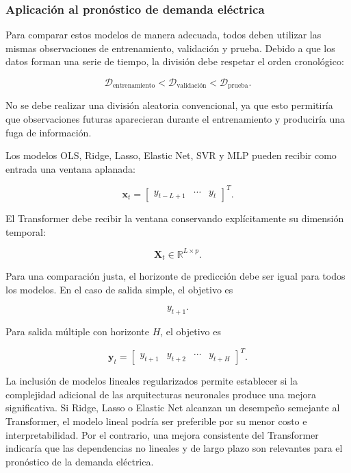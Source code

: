 \subsubsection{Aplicación al pronóstico de demanda eléctrica}
\label{sec:aplicacion_demanda}

Para comparar estos modelos de manera adecuada, todos deben utilizar las mismas observaciones de entrenamiento, validación y prueba. Debido a que los datos forman una serie de tiempo, la división debe respetar el orden cronológico:

\begin{equation}
    \mathcal{D}_{\mathrm{entrenamiento}}
    <
    \mathcal{D}_{\mathrm{validación}}
    <
    \mathcal{D}_{\mathrm{prueba}}.
\end{equation}

No se debe realizar una división aleatoria convencional, ya que esto permitiría que observaciones futuras aparecieran durante el entrenamiento y produciría una fuga de información.

Los modelos OLS, Ridge, Lasso, Elastic Net, SVR y MLP pueden recibir como entrada una ventana aplanada:

\begin{equation}
    \mathbf{x}_t
    =
    \begin{bmatrix}
        y_{t-L+1} &
        \cdots &
        y_t
    \end{bmatrix}^{T}.
\end{equation}

El Transformer debe recibir la ventana conservando explícitamente su dimensión temporal:

\begin{equation}
    \mathbf{X}_t
    \in
    \mathbb{R}^{L\times p}.
\end{equation}

Para una comparación justa, el horizonte de predicción debe ser igual para todos los modelos. En el caso de salida simple, el objetivo es

\begin{equation}
    y_{t+1}.
\end{equation}

Para salida múltiple con horizonte $H$, el objetivo es

\begin{equation}
    \mathbf{y}_t
    =
    \begin{bmatrix}
        y_{t+1} &
        y_{t+2} &
        \cdots &
        y_{t+H}
    \end{bmatrix}^{T}.
\end{equation}

La inclusión de modelos lineales regularizados permite establecer si la complejidad adicional de las arquitecturas neuronales produce una mejora significativa. Si Ridge, Lasso o Elastic Net alcanzan un desempeño semejante al Transformer, el modelo lineal podría ser preferible por su menor costo e interpretabilidad. Por el contrario, una mejora consistente del Transformer indicaría que las dependencias no lineales y de largo plazo son relevantes para el pronóstico de la demanda eléctrica.